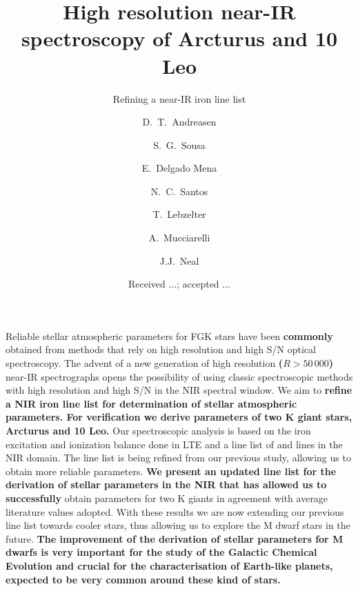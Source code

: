 \documentclass{aa}
\begin{document}
\title{High resolution near-IR spectroscopy of Arcturus and 10 Leo}
\subtitle{Refining a near-IR iron line list}


\author{ D.~T.~Andreasen
    \and S.~G.~Sousa
    \and E.~Delgado Mena
    \and N.~C.~Santos
    \and T.~Lebzelter
    \and A.~Mucciarelli
    \and J.J.~Neal}







\date{Received ...; accepted ...}

\abstract
{Reliable stellar atmospheric parameters for FGK stars have been {\bf commonly} obtained from
methods that rely on high resolution and high S/N optical spectroscopy. The advent of a new
generation of high resolution {\bf ($R>50\,000$)} near-IR spectrographs opens the possibility of
using classic spectroscopic methods with high resolution and high S/N in the NIR spectral window.}
{We aim to {\bf refine a NIR iron line list for determination of stellar atmospheric parameters. For
verification we derive parameters of two K giant stars, Arcturus and 10 Leo.}}
{Our spectroscopic analysis is based on the iron excitation and ionization balance done in LTE and a
line list of  and  lines in the NIR domain. The line list is being refined
from our previous study, allowing us to obtain more reliable parameters.}
{{\bf We present an updated line list for the derivation of stellar parameters in the NIR that has
allowed us to successfully} obtain parameters for two K giants in agreement with average literature
values adopted.}
{With these results we are now extending our previous line list towards cooler stars, thus allowing
us to explore the M dwarf stars in the future. {\bf The improvement of the derivation of stellar
parameters for M dwarfs is very important for the study of the Galactic Chemical Evolution and
crucial for the characterisation of Earth-like planets, expected to be very common around these kind
of stars.}}
\end{document}
